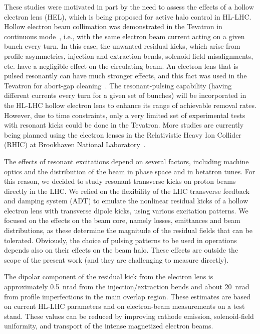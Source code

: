 \documentclass[aps
,prstab
,reprint
,longbibliography
,preprintnumbers
,showkeys
,amsfonts,amssymb,amsmath
,floatfix
]{revtex4-1}
\begin{document}
These studies were motivated in part by the need to assess the effects
of a hollow electron lens (HEL), which is being proposed for active
halo control in HL-LHC. Hollow electron beam collimation was
demonstrated in the Tevatron in continuous
mode~\cite{hel_tevatron_stancari}, i.e., with the same electron beam
current acting on a given bunch every turn. In this case, the unwanted
residual kicks, which arise from profile asymmetries, injection and
extraction bends, solenoid field misalignments, etc. have a negligible
effect on the circulating beam. An electron lens that is pulsed
resonantly can have much stronger effects, and this fact was used in
the Tevatron for abort-gap
cleaning~\cite{hel_tevatron_abortgap_zhang}. The resonant-pulsing
capability (having different currents every turn for a given set of
bunches) will be incorporated in the HL-LHC hollow electron lens to
enhance its range of achievable removal rates. However, due to time
constraints, only a very limited set of experimental tests with
resonant kicks could be done in the Tevatron. More studies are
currently being planned using the electron lenses in the Relativistic
Heavy Ion Collider (RHIC) at Brookhaven National
Laboratory~\cite{Fischer:PRL:2015}.

The effects of resonant excitations depend on several factors,
including machine optics and the distribution of the beam in phase
space and in betatron tunes. For this reason, we decided to study
resonant transverse kicks on proton beams directly in the LHC. We
relied on the flexibility of the LHC transverse feedback and damping
system (ADT) to emulate the nonlinear residual kicks of a hollow
electron lens with transverse dipole kicks, using various excitation
patterns. We focused on the effects on the beam core, namely losses,
emittances and beam distributions, as these determine the magnitude of
the residual fields that can be tolerated. Obviously, the choice of
pulsing patterns to be used in operations depends also on their
effects on the beam halo. These effects are outside the scope of the
present work (and they are challenging to measure directly).

The dipolar component of the residual kick from the electron lens is
approximately 0.5~nrad from the injection/extraction bends and about
20~nrad from profile imperfections in the main overlap region. These
estimates are based on current HL-LHC parameters and on electron-beam
measurements on a test stand. These values can be reduced by improving
cathode emission, solenoid-field uniformity, and transport of the
intense magnetized electron beams.
\end{document}
